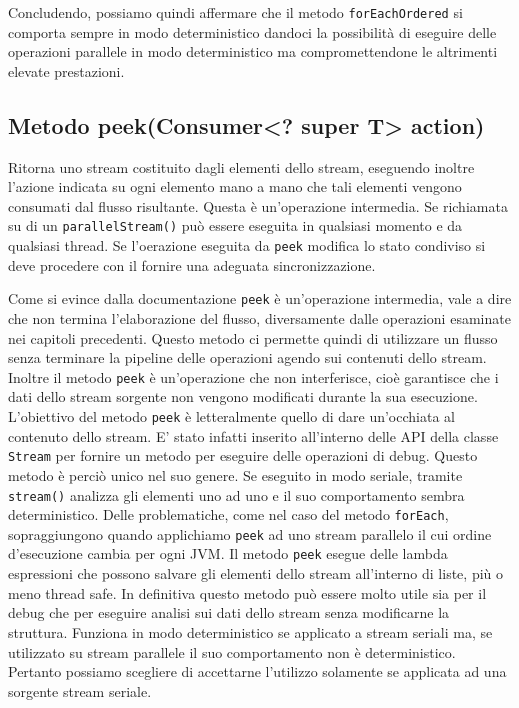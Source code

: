 			Concludendo, possiamo quindi affermare che il metodo \lstinline|forEachOrdered| si comporta sempre in modo deterministico dandoci la possibilità di eseguire delle operazioni parallele in modo deterministico ma compromettendone le altrimenti elevate prestazioni. 
		
		
		\subsection{Metodo peek(Consumer<? super T> action)}
			Ritorna uno stream costituito dagli elementi dello stream, eseguendo inoltre l'azione indicata su ogni elemento mano a mano che tali elementi vengono consumati dal flusso risultante. Questa è un'operazione intermedia. Se richiamata su di un \lstinline|parallelStream()| può essere eseguita in qualsiasi momento e da qualsiasi thread. Se l'oerazione eseguita da \lstinline|peek| modifica lo stato condiviso si deve procedere con il fornire una adeguata sincronizzazione. 
			
			Come si evince dalla documentazione \lstinline|peek| è un'operazione intermedia, vale a dire che non termina l'elaborazione del flusso, diversamente dalle operazioni esaminate nei capitoli precedenti. Questo metodo ci permette quindi di utilizzare un flusso senza terminare la pipeline delle operazioni agendo sui contenuti dello stream. Inoltre il metodo \lstinline|peek| è un'operazione che non interferisce, cioè garantisce che i dati dello stream sorgente non vengono modificati durante la sua esecuzione. L'obiettivo del metodo \lstinline|peek| è letteralmente quello di dare un'occhiata al contenuto dello stream. E' stato infatti inserito all'interno delle API della classe \lstinline|Stream| per fornire un metodo per eseguire delle operazioni di debug. Questo metodo è perciò unico nel suo genere. Se eseguito in modo seriale, tramite \lstinline|stream()| analizza gli elementi uno ad uno e il suo comportamento sembra deterministico. Delle problematiche, come nel caso del metodo \lstinline|forEach|, sopraggiungono quando applichiamo \lstinline|peek| ad uno stream parallelo il cui ordine d'esecuzione cambia per ogni JVM. Il metodo \lstinline|peek| esegue delle lambda espressioni che possono salvare gli elementi dello stream all'interno di liste, più o meno thread safe. In definitiva questo metodo può essere molto utile sia per il debug che per eseguire analisi sui dati dello stream senza modificarne la struttura. Funziona in modo deterministico se applicato a stream seriali ma, se utilizzato su stream parallele il suo comportamento non è deterministico. Pertanto possiamo scegliere di accettarne l'utilizzo solamente se applicata ad una sorgente stream seriale.


